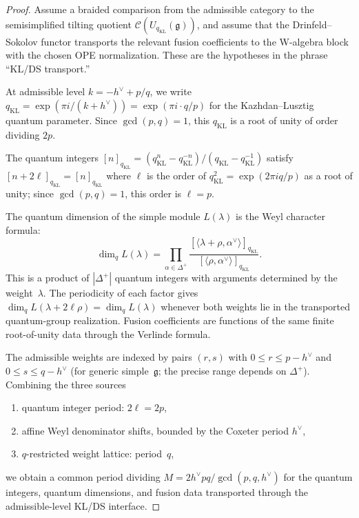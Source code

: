 \begin{proof}
Assume a braided comparison from the admissible category to the
semisimplified tilting quotient
$\mathcal{C}(U_{q_{\mathrm{KL}}}(\mathfrak g))$, and assume that the
Drinfeld--Sokolov functor transports the relevant fusion coefficients
to the W-algebra block with the chosen OPE normalization. These are
the hypotheses in the phrase ``KL/DS transport.''

At admissible level $k = -h^\vee + p/q$, we write $q_{\mathrm{KL}} = \exp(\pi i/(k + h^\vee)) = \exp(\pi i \cdot q/p)$ for the Kazhdan--Lusztig quantum parameter. Since $\gcd(p,q) = 1$, this $q_{\mathrm{KL}}$ is a root of unity of order dividing $2p$.

The quantum integers $[n]_{q_{\mathrm{KL}}} = (q_{\mathrm{KL}}^n - q_{\mathrm{KL}}^{-n})/(q_{\mathrm{KL}} - q_{\mathrm{KL}}^{-1})$ satisfy $[n + 2\ell]_{q_{\mathrm{KL}}} = [n]_{q_{\mathrm{KL}}}$ where $\ell$ is the order of $q_{\mathrm{KL}}^2 = \exp(2\pi i q/p)$ as a root of unity; since $\gcd(p,q) = 1$, this order is $\ell = p$.

The quantum dimension of the simple module $L(\lambda)$ is the Weyl character formula:
\[
\dim_q L(\lambda) = \prod_{\alpha \in \Delta^+}
\frac{[\langle \lambda + \rho, \alpha^\vee \rangle]_{q_{\mathrm{KL}}}}
 {[\langle \rho, \alpha^\vee \rangle]_{q_{\mathrm{KL}}}}.
\]
This is a product of $|\Delta^+|$ quantum integers with arguments
determined by the weight~$\lambda$. The periodicity of each factor
gives $\dim_q L(\lambda + 2\ell\rho) = \dim_q L(\lambda)$ whenever both
weights lie in the transported quantum-group realization. Fusion
coefficients are functions of the same finite root-of-unity data
through the Verlinde formula.

The admissible weights are indexed by pairs $(r,s)$ with $0 \leq r \leq p - h^\vee$ and $0 \leq s \leq q - h^\vee$ (for generic simple~$\mathfrak{g}$; the precise range depends on $\Delta^+$). Combining the three sources
\begin{enumerate}[label=(\alph*)]
\item quantum integer period: $2\ell = 2p$,
\item affine Weyl denominator shifts, bounded by the Coxeter period $h^\vee$,
\item $q$-restricted weight lattice: period~$q$,
\end{enumerate}
we obtain a common period dividing
$M = 2h^\vee pq / \gcd(p,q,h^\vee)$ for the quantum integers, quantum
dimensions, and fusion data transported through the admissible-level
KL/DS interface.
\end{proof}

